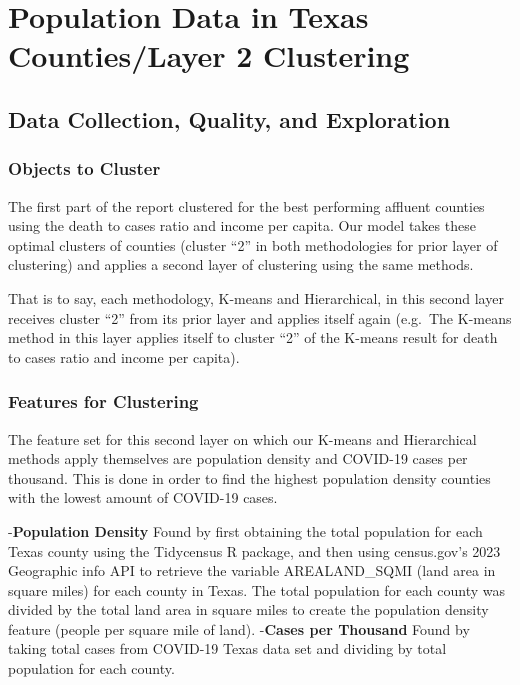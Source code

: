 \documentclass[
]{article}
\begin{document}
\newpage

\section{Population Data in Texas Counties/Layer 2
Clustering}\label{population-data-in-texas-countieslayer-2-clustering}

\subsection{Data Collection, Quality, and
Exploration}\label{data-collection-quality-and-exploration-1}

\subsubsection{Objects to Cluster}\label{objects-to-cluster-1}

The first part of the report clustered for the best performing affluent
counties using the death to cases ratio and income per capita. Our model
takes these optimal clusters of counties (cluster ``2'' in both
methodologies for prior layer of clustering) and applies a second layer
of clustering using the same methods.

That is to say, each methodology, K-means and Hierarchical, in this
second layer receives cluster ``2'' from its prior layer and applies
itself again (e.g.~The K-means method in this layer applies itself to
cluster ``2'' of the K-means result for death to cases ratio and income
per capita).

\subsubsection{Features for Clustering}\label{features-for-clustering-1}

The feature set for this second layer on which our K-means and
Hierarchical methods apply themselves are population density and
COVID-19 cases per thousand. This is done in order to find the highest
population density counties with the lowest amount of COVID-19 cases.

-\textbf{Population Density} Found by first obtaining the total
population for each Texas county using the Tidycensus R package, and
then using census.gov's 2023 Geographic info API to retrieve the
variable AREALAND\_SQMI (land area in square miles) for each county in
Texas. The total population for each county was divided by the total
land area in square miles to create the population density feature
(people per square mile of land). -\textbf{Cases per Thousand} Found by
taking total cases from COVID-19 Texas data set and dividing by total
population for each county.
\end{document}
